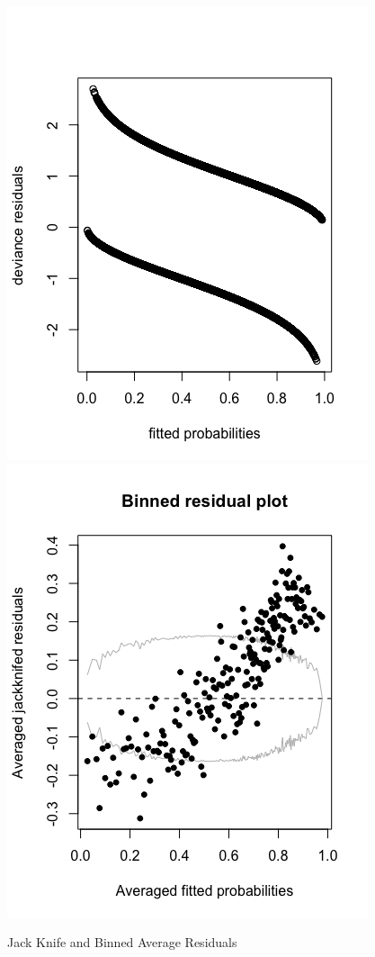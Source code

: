 \documentclass[11pt, oneside]{article}   	%
\begin{document}
  \FloatBarrier
  \begin{figure}[!ht]
    \centering
    \includegraphics[scale=.5]{pp11.png} \includegraphics[scale=.5]{pp22.png}

    \caption{Jack Knife and Binned Average Residuals}
  \end{figure}
  \FloatBarrier
\end{document}
